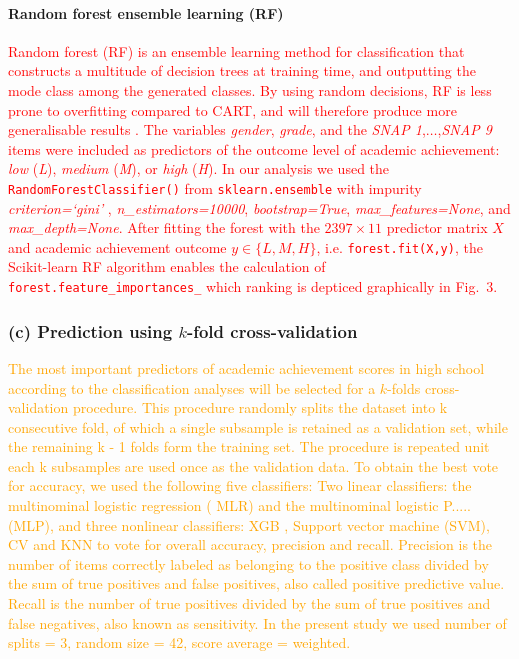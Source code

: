 \documentclass[10pt,letterpaper]{article}
\begin{document}
{{\paragraph{Random forest ensemble learning (RF)}
\textcolor{red}{Random forest (RF) is an ensemble learning method for classification that constructs a multitude of decision trees at training time, and outputting the mode class among 
the generated classes. By using random decisions, RF is less prone to overfitting compared to CART, and will therefore produce more generalisable results \cite{Breiman2001}.  
The variables {\it gender}, {\it grade}, and the {\it SNAP 1},$\ldots$,{\it SNAP 9} items were included as predictors of the outcome level of academic achievement:
{\it low} ({\it L}), {\it medium} ({\it M}), or {\it high} ({\it H}).
In our analysis we used the {\tt \small RandomForestClassifier()}  from {\tt \small sklearn.ensemble} with impurity {\it criterion=`gini'} ,
{\it n\_estimators=10000}, {\it bootstrap=True}, {\it max\_features=None}, and {\it max\_depth=None}. 
After fitting the forest with the $2397 \times 11$ predictor matrix $X$ and academic achievement outcome $y \in \{L, M, H\} $, i.e. {\tt \small forest.fit(X,y)}, the 
Scikit-learn RF algorithm enables the calculation of {\tt \small forest.feature\_importances\_} which ranking is depticed graphically in Fig.~3.}



\subsubsection*{(c) Prediction using $k$-fold cross-validation}

\textcolor{orange}{The most important predictors of academic achievement scores in high school according to the classification analyses will be selected for a $k$-folds cross-validation procedure. This procedure randomly splits the dataset into k consecutive fold, of which a single subsample is retained as a validation set, while the remaining k - 1 folds form the training set. The procedure is repeated unit each k subsamples are used once as the validation data. 
To obtain the best vote for accuracy, we used the following five classifiers: Two linear  classifiers: the multinominal logistic regression ( MLR) and the multinominal logistic P.....(MLP), and three nonlinear classifiers: XGB , Support vector machine (SVM), CV  and KNN to vote for overall accuracy, precision and recall. 
Precision is the number of items correctly labeled as belonging to the positive class divided by the sum of true positives and false positives, also called positive predictive value. Recall is the number of true positives divided by the sum of true positives and false negatives, also known as sensitivity. 
In the present study we used number of splits = 3, random size = 42, score average = weighted.}


}}
\end{document}
